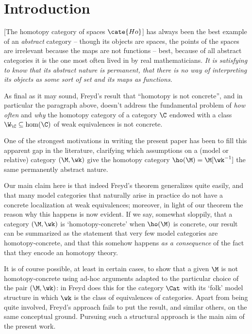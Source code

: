 \section{Introduction}
\begin{aquote}{\cite{fconc}}
[The homotopy category of spaces $\cate{Ho}$] has always been the best example
of an \emph{abstract} category -- though its objects are spaces, the points of
the spaces are irrelevant because the maps are not functions -- best, because of
all abstract categories it is the one most often lived in by real
mathematicians. \emph{It is satisfying to know that its abstract nature is
permanent, that there is no way of interpreting its objects as some sort of set
and its maps as functions.}
\end{aquote}
As final as it may sound, Freyd's result that ``homotopy is not concrete'', and
in particular the paragraph above, doesn't address the fundamental problem of
\emph{how often} and \emph{why} the homotopy category of a category $\C$ endowed
with a class $\W_\C \subseteq \hom(\C)$ of weak equivalences is not concrete.

One of the strongest motivations in writing the present paper has been to fill
this apparent gap in the literature, clarifying which assumptions on a (model or
relative) category $(\M, \wk)$ give the homotopy category $\ho(\M) =
\M[\wk^{-1}]$ the same permanently abstract nature.

Our main claim here is that indeed Freyd's theorem generalizes quite easily,
and that many model categories that naturally arise in practice 
do not have a concrete localization at weak
equivalences; moreover, in light of our theorem the reason why this happens is
now evident. If we say, somewhat sloppily, that a category $(\M,\wk)$ is
`homotopy\hyp{}concrete' when $\ho(\M)$ is concrete, our result can be
summarized as the statement that very few model categories are
homotopy\hyp{}concrete, and that this somehow happens \emph{as a consequence} of the
fact that they encode an homotopy theory.

It is of course possible, at least in certain cases, to show that a given $\M$
is not homotopy\hyp{}concrete using ad-hoc arguments adapted to the particular
choice of the pair $(\M, \wk)$: in \cite{fconc} Freyd does this for the category
$\Cat$ with its `folk' model structure in which $\wk$ is the class of equivalences
of categories. Apart from being quite involved, Freyd's approach fails
to put the result, and similar others, on the same conceptual ground. Pursuing such a 
structural approach is the main aim of the present work.

